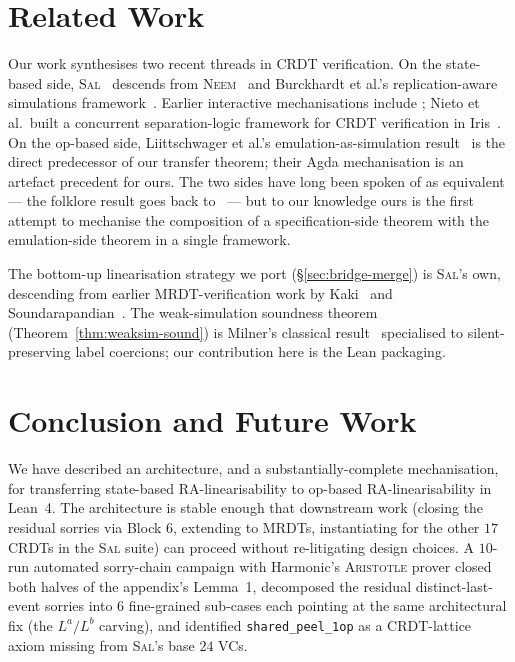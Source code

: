 \documentclass[11pt,a4paper]{article}
\theoremstyle{definition}
\theoremstyle{remark}
\newcommand{\Sal}{\textsc{Sal}}
\begin{document}
\section{Related Work}
\label{sec:related}

Our work synthesises two recent threads in CRDT verification. On
the state-based side, \Sal{}~\cite{sal2025} descends from
\textsc{Neem}~\cite{neem2025} and Burckhardt et
al.'s replication-aware simulations framework~\cite{burckhardt-rdts-svo}.
Earlier interactive mechanisations include
\cite{zeller-state-based,gomes-verifying-sec}; Nieto et al.\ built
a concurrent separation-logic framework for CRDT verification in
Iris~\cite{nieto-aneris-state-based,timany-trillium}.
On the op-based side, Liittschwager et al.'s emulation-as-simulation
result~\cite{liittschwager2025} is the direct predecessor of our
transfer theorem; their Agda mechanisation is an artefact precedent
for ours. The two sides have long been spoken of as equivalent ---
the folklore result goes back to~\cite{shapiro-crdts} --- but to our
knowledge ours is the first attempt to mechanise the composition of
a specification-side theorem with the emulation-side theorem in a
single framework.

The bottom-up linearisation strategy we port
(\S\ref{sec:bridge-merge}) is \Sal{}'s own, descending from
earlier MRDT-verification work by Kaki~\cite{kaki2022} and
Soundarapandian~\cite{vimala-mrdts}. The weak-simulation soundness
theorem (Theorem~\ref{thm:weaksim-sound}) is Milner's classical
result~\cite{milner-ccs} specialised to silent-preserving label
coercions; our contribution here is the Lean packaging.

\section{Conclusion and Future Work}
\label{sec:conclusion}

We have described an architecture, and a substantially-complete
mechanisation, for transferring state-based RA-linearisability to
op-based RA-linearisability in Lean~4. The architecture is stable
enough that downstream work (closing the residual sorries via
Block 6, extending to MRDTs, instantiating for the other $17$
CRDTs in the \Sal{} suite) can proceed without re-litigating
design choices. A $10$-run automated sorry-chain campaign with
Harmonic's \textsc{Aristotle} prover closed both halves of the
appendix's Lemma~1, decomposed the residual distinct-last-event
sorries into $6$ fine-grained sub-cases each pointing at the
same architectural fix (the $L^a / L^b$ carving), and identified
\texttt{shared\_peel\_1op} as a CRDT-lattice axiom missing from
\Sal{}'s base $24$ VCs.
\end{document}
